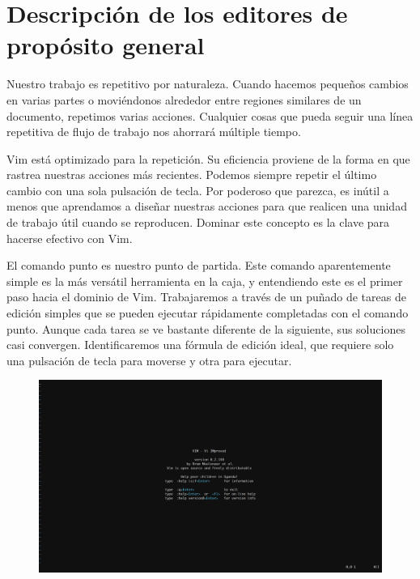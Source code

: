 \chapter{Descripción de los editores de propósito general}

Nuestro trabajo es repetitivo por naturaleza. Cuando hacemos pequeños cambios en varias partes o moviéndonos alrededor entre regiones similares de un documento, repetimos varias acciones. Cualquier cosas que pueda seguir una línea repetitiva de flujo de trabajo nos ahorrará múltiple tiempo.

Vim está optimizado para la repetición. Su eficiencia proviene de la forma en que rastrea nuestras acciones más recientes. Podemos siempre repetir el último cambio con una sola pulsación de tecla. Por poderoso que parezca, es inútil a menos que aprendamos a diseñar nuestras acciones para que realicen una unidad de trabajo útil cuando se reproducen. Dominar este concepto es la clave para hacerse efectivo con Vim.

El comando punto es nuestro punto de partida. Este comando aparentemente simple es la más versátil herramienta en la caja, y entendiendo este es el primer paso hacia el dominio de Vim. Trabajaremos a través de un puñado de tareas de edición simples que se pueden ejecutar rápidamente completadas con el comando punto. Aunque cada tarea se ve bastante diferente de la siguiente, sus soluciones casi convergen. Identificaremos una fórmula de edición ideal, que requiere solo una pulsación de tecla para moverse y otra para ejecutar.

\begin{figure}[ht!]
\centering
\includegraphics[width=0.8\paperwidth]{./img/VimStart}
\end{figure}


